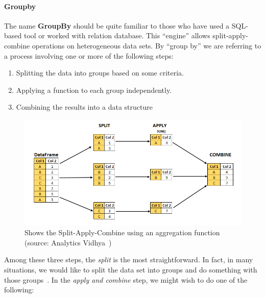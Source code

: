 \paragraph{Groupby}\label{par:groupby}
The name \textbf{GroupBy} should be quite familiar to those who have used a SQL-based tool or worked with relation database. This ``engine'' allows split-apply-combine operations on heterogeneous data sets.
By ``group by'' we are referring to a process involving one or more of the following steps:
\begin{enumerate}
    \item Splitting the data into groups based on some criteria.
    \item Applying a function to each group independently.
    \item Combining the results into a data structure
\end{enumerate}
\begin{figure}[ht]
    \centering
    \includegraphics[width=\linewidth]{content/chapter_3/images/split-apply-combine.png}
    \caption{Shows the Split-Apply-Combine using an aggregation function (source: Analytics Vidhya~\cite{Misc:pandey_split-apply-combine})}\label{fig:pandas_groupby}
\end{figure}
Among these three steps, the \textit{split} is the most straightforward. In fact, in many situations, we would like to split the data set into groups and do something with those groups~\cite{reback_pandas-dev/pandas:_2022}.
In the \textit{apply and combine} step, we might wish to do one of the following:
